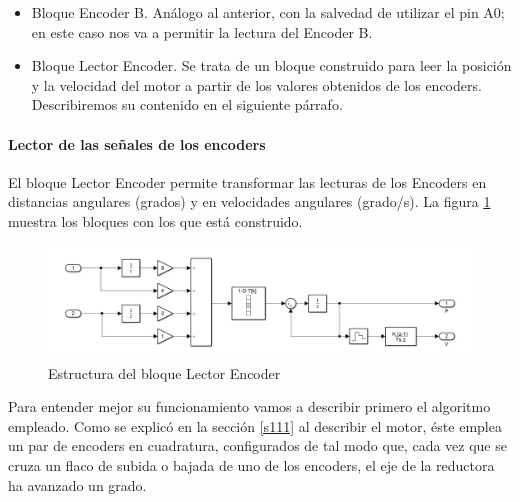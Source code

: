 \documentclass[10pt,a4paper]{report}
\begin{document}
\begin{itemize}
\item Bloque Encoder B. Análogo al anterior, con la salvedad de utilizar el pin A0; en este caso nos va a permitir la lectura del Encoder B.

\item Bloque Lector Encoder. Se trata de un bloque construido para leer la posición y la velocidad del motor a partir de los valores obtenidos de los encoders. Describiremos su contenido en el siguiente párrafo.
\end{itemize}

\paragraph{Lector de las señales de los encoders} El bloque Lector Encoder permite transformar las lecturas de los Encoders en distancias angulares (grados) y en velocidades angulares (grado/s). La figura \ref{f20} muestra los bloques con los que está construido.
\begin{figure}
\includegraphics[width=\textwidth]{la3.jpg}
\caption{Estructura del bloque Lector Encoder}
\label{f20}
\end{figure} 
Para entender mejor su funcionamiento vamos a describir primero el algoritmo empleado. Como se explicó en la sección \ref{s111} al describir el motor, éste emplea un par de encoders en cuadratura, configurados de tal modo que, cada vez que se cruza un flaco de subida o bajada de uno de los encoders, el eje de la reductora ha avanzado un grado.
\end{document}
